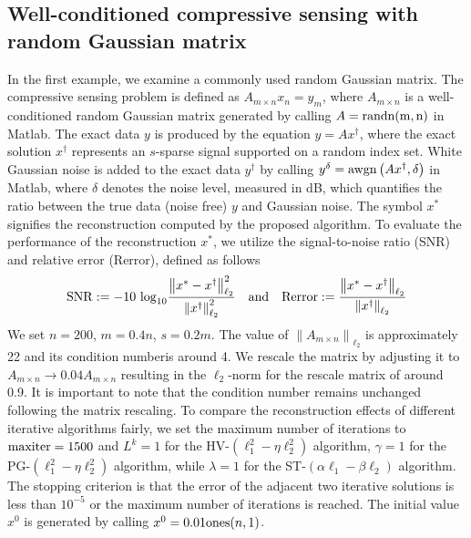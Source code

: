 \documentclass[a4paper,12pt]{article}
\numberwithin{equation}{section}
\begin{document}
\subsection{Well-conditioned compressive sensing with random Gaussian matrix}\label{sec6.1}

\par In the first example, we examine a commonly used random Gaussian matrix. The compressive sensing problem is defined as $A_{m\times n}x_{n}=y_{m}$, where $A_{m\times n}$ is a well-conditioned random Gaussian matrix generated by calling $A={\rm randn(m,n)}$ in Matlab. The exact data $y$ is produced by the equation $y=Ax^{\dagger}$, where the exact solution $x^{\dagger}$ represents an $s$-sparse signal supported on a random index set. White Gaussian noise is added to the exact data $y^{\dagger}$ by calling $y^{\delta}={\rm awgn}\left(Ax^{\dagger},\delta\right)$ in Matlab, where $\delta$ denotes the noise level, measured in dB, which quantifies the ratio between the true data (noise free) $y$ and Gaussian noise. The symbol $x^{*}$ signifies the reconstruction computed by the proposed algorithm. To evaluate the performance of the reconstruction $x^{*}$, we utilize the signal-to-noise ratio (SNR) and relative error (Rerror), defined as follows
\begin{equation*}
    {\rm SNR}:=-10\ {\rm log}_{10}\frac{\left\|x^{*}-x^{\dagger}\right\|_{\ell_{2}}^{2}} {\left\|x^{\dagger}\right\|_{\ell_{2}}^{2}}\quad {\rm and} \quad {\rm Rerror}:=\frac{\left\|x^{*}-x^{\dagger}\right\|_{\ell_{2}}} {\left\|x^{\dagger}\right\|_{\ell_{2}}} 
\end{equation*}
We set $n=200$, $m=0.4n$, $s=0.2m$. The value of $\left\|A_{m\times n}\right\|_{\ell_{2}}$ is approximately 22 and its condition numberis around 4. We rescale the matrix by adjusting it to $A_{m\times n}\rightarrow 0.04A_{m\times n}$ resulting in the $\ell_{2}$-norm for the rescale matrix of around 0.9. It is important to note that the condition number remains unchanged following the matrix rescaling. To compare the reconstruction effects of different iterative algorithms fairly, we set the maximum number of iterations to ${\rm maxiter} = 1500$ and $L^{k}=1$ for the HV-$\left(\ell_{1}^{2}-\eta\ell_{2}^{2}\right)$ algorithm, $\gamma=1$ for the PG-$\left(\ell_{1}^{2}-\eta\ell_{2}^{2}\right)$ algorithm, while $\lambda=1$ for the ST-$\left(\alpha\ell_{1}-\beta\ell_{2}\right)$ algorithm. The stopping criterion is that the error of the adjacent two iterative solutions is less than $10^{-5}$ or the maximum number of iterations is reached. The initial value $x^{0}$ is generated by calling $x^{0}=0.01{\rm ones}(n,1)$.
\end{document}
